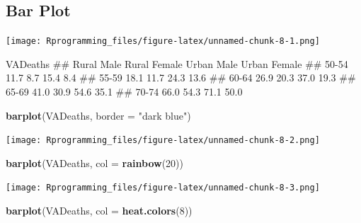 \documentclass[10pt,]{krantz}
\makeatletter
\newenvironment{Shaded}{\begin{snugshade}}{\end{snugshade}}
\newcommand{\KeywordTok}[1]{\textcolor[rgb]{0.13,0.29,0.53}{\textbf{#1}}}
\newcommand{\DataTypeTok}[1]{\textcolor[rgb]{0.13,0.29,0.53}{#1}}
\newcommand{\DecValTok}[1]{\textcolor[rgb]{0.00,0.00,0.81}{#1}}
\newcommand{\StringTok}[1]{\textcolor[rgb]{0.31,0.60,0.02}{#1}}
\newcommand{\OperatorTok}[1]{\textcolor[rgb]{0.81,0.36,0.00}{\textbf{#1}}}
\newcommand{\NormalTok}[1]{#1}
\newenvironment{kframe}{%
\medskip{}
\setlength{\fboxsep}{.8em}
 \def\at@end@of@kframe{}%
 \ifinner\ifhmode%
  \def\at@end@of@kframe{\end{minipage}}%
  \begin{minipage}{\columnwidth}%
 \fi\fi%
 \def\FrameCommand##1{\hskip\@totalleftmargin \hskip-\fboxsep
 \colorbox{shadecolor}{##1}\hskip-\fboxsep
     \hskip-\linewidth \hskip-\@totalleftmargin \hskip\columnwidth}%
 \MakeFramed {\advance\hsize-\width
   \@totalleftmargin\z@ \linewidth\hsize
   \@setminipage}}%
 {\par\unskip\endMakeFramed%
 \at@end@of@kframe}
\renewenvironment{Shaded}{\begin{kframe}}{\end{kframe}}
\theoremstyle{definition}
\theoremstyle{definition}
\theoremstyle{remark}
\makeatother
\begin{document}
\subsection{Bar Plot}\label{bar-plot}

\begin{Shaded}
\end{Shaded}

\texttt{[image: Rprogramming\_files/figure-latex/unnamed-chunk-8-1.png]}

\begin{Shaded}
\begin{Highlighting}[]

\NormalTok{VADeaths}
\NormalTok{##       Rural Male Rural Female Urban Male Urban Female}
\NormalTok{## 50-54       11.7          8.7       15.4          8.4}
\NormalTok{## 55-59       18.1         11.7       24.3         13.6}
\NormalTok{## 60-64       26.9         20.3       37.0         19.3}
\NormalTok{## 65-69       41.0         30.9       54.6         35.1}
\NormalTok{## 70-74       66.0         54.3       71.1         50.0}

\KeywordTok{barplot}\NormalTok{(VADeaths, }\DataTypeTok{border =} \StringTok{"dark blue"}\NormalTok{)}
\end{Highlighting}
\end{Shaded}

\texttt{[image: Rprogramming\_files/figure-latex/unnamed-chunk-8-2.png]}

\begin{Shaded}
\begin{Highlighting}[]

\KeywordTok{barplot}\NormalTok{(VADeaths, }\DataTypeTok{col =} \KeywordTok{rainbow}\NormalTok{(}\DecValTok{20}\NormalTok{))}
\end{Highlighting}
\end{Shaded}

\texttt{[image: Rprogramming\_files/figure-latex/unnamed-chunk-8-3.png]}

\begin{Shaded}
\begin{Highlighting}[]

\KeywordTok{barplot}\NormalTok{(VADeaths, }\DataTypeTok{col =} \KeywordTok{heat.colors}\NormalTok{(}\DecValTok{8}\NormalTok{))}
\end{Highlighting}
\end{Shaded}
\end{document}
